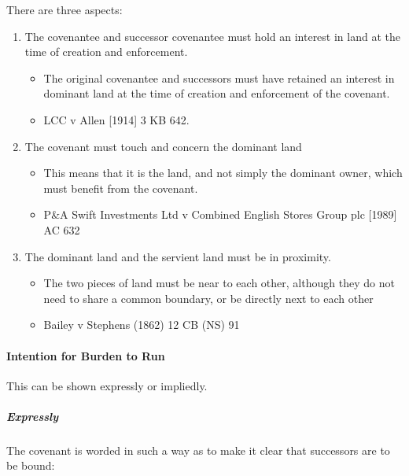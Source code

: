 \documentclass[
]{article}
\providecommand{\tightlist}{%
  \setlength{\itemsep}{0pt}\setlength{\parskip}{0pt}}
\begin{document}
There are three aspects:

\begin{enumerate}
\tightlist
\item
  The covenantee and successor covenantee must hold an interest in land
  at the time of creation and enforcement.

  \begin{itemize}
  \tightlist
  \item
    The original covenantee and successors must have retained an
    interest in dominant land at the time of creation and enforcement of
    the covenant.
  \item
    LCC v Allen {[}1914{]} 3 KB 642.
  \end{itemize}
\item
  The covenant must touch and concern the dominant land

  \begin{itemize}
  \tightlist
  \item
    This means that it is the land, and not simply the dominant owner,
    which must benefit from the covenant.
  \item
    P\&A Swift Investments Ltd v Combined English Stores Group plc
    {[}1989{]} AC 632
  \end{itemize}
\item
  The dominant land and the servient land must be in proximity.

  \begin{itemize}
  \tightlist
  \item
    The two pieces of land must be near to each other, although they do
    not need to share a common boundary, or be directly next to each
    other
  \item
    Bailey v Stephens (1862) 12 CB (NS) 91
  \end{itemize}
\end{enumerate}

\hypertarget{intention-for-burden-to-run}{%
\paragraph{Intention for Burden to
Run}\label{intention-for-burden-to-run}}

This can be shown expressly or impliedly.

\hypertarget{expressly}{%
\subparagraph{Expressly}\label{expressly}}

The covenant is worded in such a way as to make it clear that successors
are to be bound:
\end{document}

